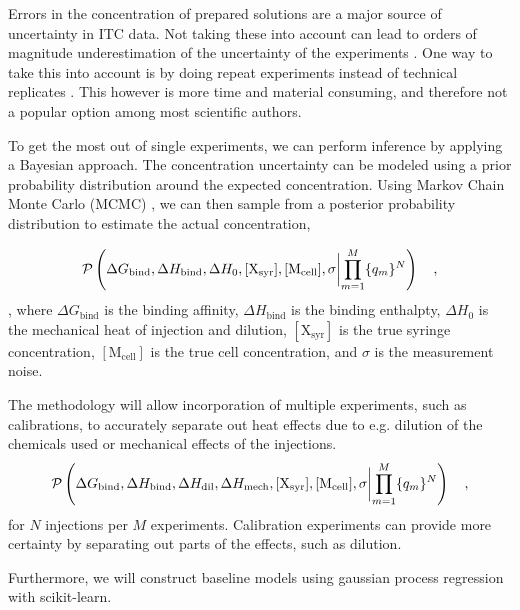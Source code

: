 \documentclass[10pt,final]{article}
\begin{document}
Errors in the concentration of prepared solutions are a major source of uncertainty in ITC data. Not taking these into account can lead to orders of magnitude underestimation of the uncertainty of the experiments \cite{Myszka2003a}. One way to take this into account is by doing repeat experiments instead of technical replicates \cite{Vaux2012a}. This however is more time and material consuming, and therefore not a popular option among most scientific authors. 

To get the most out of single experiments, we can perform inference by applying a Bayesian approach. The concentration uncertainty can be modeled using a prior probability distribution around the expected concentration. Using Markov Chain Monte Carlo (MCMC) \cite{Metropolis1953a,Hastings1970a}, we can then sample from a posterior probability distribution to estimate the actual concentration,

\[
\mathcal{P} \left(\Delta G_\mathrm{bind}, \Delta H_\mathrm{bind}, \Delta H_0, [\mathrm{X_{syr}}], [\mathrm{M_{cell}}], \sigma \biggl{|} \prod\limits_{m=1}^{M}\{q_m\}^{N}\right) \quad,
\]
, where $\Delta G_\mathrm{bind}$ is the binding affinity, $\Delta H_\mathrm{bind}$ is the binding enthalpty, $\Delta H_0$ is the mechanical heat of injection and dilution, $[\mathrm{X_{syr}}]$ is the true syringe concentration, $[\mathrm{M_{cell}}]$ is the true cell concentration, and $\sigma$ is the measurement noise.



The methodology will allow incorporation of multiple experiments, such as calibrations, to accurately separate out heat effects due to e.g. dilution of the chemicals used or mechanical effects of the injections.
\begin{align}
	 \mathcal{P}\left(\Delta G_\mathrm{bind}, \Delta H_\mathrm{bind}, \Delta H_\mathrm{dil},\Delta H_\mathrm{mech}, [\mathrm{X_{syr}}], [\mathrm{M_{cell}}], \sigma \biggl{|} \prod\limits_{m=1}^{M}\{q_m\}^{N}\right) \quad,
\end{align}
for $N$ injections per $M$ experiments. Calibration experiments can provide more certainty by separating out parts of the effects, such as dilution.

Furthermore, we will construct baseline models using gaussian process regression with scikit-learn\cite{Pedregosa2011a}.
\end{document}
